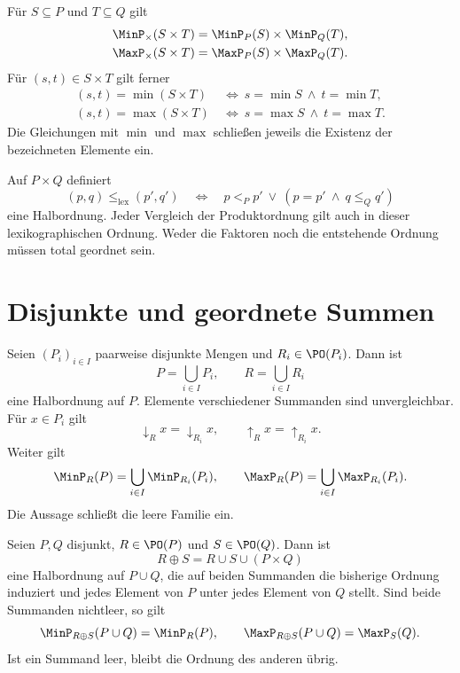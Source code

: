 \begin{theorem}
\label{b12guide:thm:product-extremal}
Für $S\subseteq P$ und $T\subseteq Q$ gilt
\[
\begin{aligned}
 \MinP_{\times}(S\times T)&=\MinP_P(S)\times\MinP_Q(T),\\
 \MaxP_{\times}(S\times T)&=\MaxP_P(S)\times\MaxP_Q(T).
\end{aligned}
\]
Für $(s,t)\in S\times T$ gilt ferner
\[
\begin{aligned}
 (s,t)=\min(S\times T)&\ \Longleftrightarrow\
       s=\min S\ \land\ t=\min T,\\
 (s,t)=\max(S\times T)&\ \Longleftrightarrow\
       s=\max S\ \land\ t=\max T.
\end{aligned}
\]
Die Gleichungen mit $\min$ und $\max$ schließen jeweils die
Existenz der bezeichneten Elemente ein.
\end{theorem}

\begin{theorem}
\label{b12guide:thm:lexicographic}
Auf $P\times Q$ definiert
\[
 (p,q)\leq_{\mathrm{lex}}(p',q')
 \quad\Longleftrightarrow\quad
 p<_P p'\ \lor\ (p=p'\ \land\ q\leq_Q q')
\]
eine Halbordnung. Jeder Vergleich der Produktordnung gilt auch
in dieser lexikographischen Ordnung. Weder die Faktoren noch
die entstehende Ordnung müssen total geordnet sein.
\end{theorem}

\section{Disjunkte und geordnete Summen}

\begin{theorem}
\label{b12guide:thm:disjoint-sum}
Seien $(P_i)_{i\in I}$ paarweise disjunkte Mengen und
$R_i\in\PO(P_i)$. Dann ist
\[
 P=\bigcup_{i\in I}P_i,\qquad R=\bigcup_{i\in I}R_i
\]
eine Halbordnung auf $P$. Elemente verschiedener Summanden
sind unvergleichbar. Für $x\in P_i$ gilt
\[
 \downarrow_R x=\downarrow_{R_i}x,\qquad
 \uparrow_R x=\uparrow_{R_i}x.
\]
Weiter gilt
\[
 \MinP_R(P)=\bigcup_{i\in I}\MinP_{R_i}(P_i),\qquad
 \MaxP_R(P)=\bigcup_{i\in I}\MaxP_{R_i}(P_i).
\]
Die Aussage schließt die leere Familie ein.
\end{theorem}

\begin{theorem}
\label{b12guide:thm:ordered-sum}
Seien $P,Q$ disjunkt, $R\in\PO(P)$ und $S\in\PO(Q)$.
Dann ist
\[
 R\oplus S=R\cup S\cup(P\times Q)
\]
eine Halbordnung auf $P\cup Q$, die auf beiden Summanden die
bisherige Ordnung induziert und jedes Element von $P$ unter
jedes Element von $Q$ stellt. Sind beide Summanden nichtleer,
so gilt
\[
 \MinP_{R\oplus S}(P\cup Q)=\MinP_R(P),\qquad
 \MaxP_{R\oplus S}(P\cup Q)=\MaxP_S(Q).
\]
Ist ein Summand leer, bleibt die Ordnung des anderen übrig.
\end{theorem}

